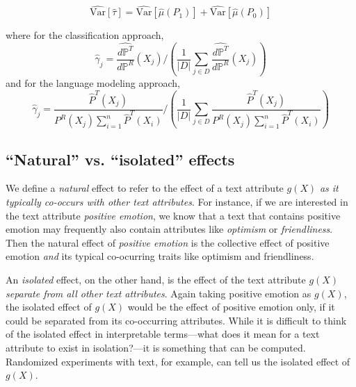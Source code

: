 \documentclass{article}
\newcommand{\vl}[1]{\textcolor{orange}{[VL: #1]}}
\begin{document}
\begin{enumerate}
    \begin{equation*}
        \widehat{\text{Var}}[\hat{\tau}] = \widehat{\text{Var}}[\hat{\mu}(P_1)] + \widehat{\text{Var}}[\hat{\mu}(P_0)]
    \end{equation*}
    
    where for the classification approach,
    \begin{equation*}
        \hat{\gamma}_j = \frac{\hat{d \mathbb{P}^T}}{d \mathbb{P}^R}(X_j) \Bigg/ \left(\frac{1}{|D|} \sum_{j \in D} \frac{\hat{d \mathbb{P}^T}}{d \mathbb{P}^R}(X_j)\right)
    \end{equation*}
    and for the language modeling approach,
    \begin{equation*}
        \hat{\gamma}_j = \frac{\hat{P}^T(X_j)}{P^R(X_j)\sum_{i=1}^n \hat{P}^T(X_i)} \Bigg/ \left(\frac{1}{|D|} \sum_{j \in D} \frac{\hat{P}^T(X_j)}{P^R(X_j)\sum_{i=1}^n \hat{P}^T(X_i)} \right)
    \end{equation*}
\end{enumerate}


\subsection{``Natural'' vs. ``isolated'' effects}

We define a \textit{natural} effect to refer to the effect of a text attribute $g(X)$ \textit{as it typically co-occurs with other text attributes}. For instance, if we are interested in the text attribute \textit{positive emotion}, we know that a text that contains positive emotion may frequently also contain attributes like \textit{optimism} or \textit{friendliness}. Then the natural effect of \textit{positive emotion} is the collective effect of positive emotion \textit{and} its typical co-ocurring traits like optimism and friendliness.

An \textit{isolated} effect, on the other hand, is the effect of the text attribute $g(X)$ \textit{separate from all other text attributes}. Again taking positive emotion as $g(X)$, the isolated effect of $g(X)$ would be the effect of positive emotion only, if it could be separated from its co-occurring attributes. While it is difficult to think of the isolated effect in interpretable terms---what does it mean for a text attribute to exist in isolation?---it is something that can be computed. Randomized experiments with text, for example, can tell us the isolated effect of $g(X)$.
\end{document}
